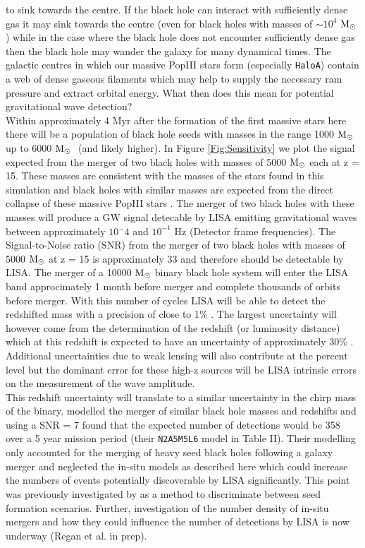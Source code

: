 \documentclass[graphics, twocolumn, usenatbib]{mn2e}
\newcommand{\msolar} {$\rm{M_{\odot}}~$}
\newcommand{\msolarc} {$\rm{M_{\odot}}$}
\newcommand{\hac} {\texttt{HaloA}}
\begin{document}
to sink towards the centre. If the black hole can interact with sufficiently dense gas it may
sink towards the centre (even for black holes with masses of $\sim 10^4$ \msolarc) while in
the case where the black hole does not encounter sufficiently dense gas then the black hole
may wander the galaxy for many dynamical times. The galactic centres in which our massive PopIII
stars form (especially \hac) contain a web of dense gaseous filaments which may help to supply
the necessary ram pressure and extract orbital energy. 
What then does this mean for potential gravitational wave detection?\\
\indent Within approximately 4 Myr after the formation of the first massive stars here there
will be a population of black hole seeds with masses in the range 1000 \msolar up to 6000 \msolar
(and likely higher). In Figure \ref{Fig:Sensitivity} we plot the signal expected from the
merger of two black holes with masses of 5000 \msolar each at z = 15. These masses
are consistent with the masses of the stars found in this simulation and black holes
with similar masses are expected from the direct collapse of these massive PopIII
stars \citep{Heger_2003}. The merger of two black holes with these masses will produce a
GW signal detecable by LISA \citep{Sesana_2016, Cornish_2020} emitting
gravitational waves between approximately $10{^-4}$ and $10^{-1}$ Hz (Detector frame frequencies). The
Signal-to-Noise ratio (SNR) from the merger of two black holes with masses of 5000 \msolar at z = 15
is approximately 33 and therefore should be detectable by LISA. The merger of a 10000 \msolar binary
black hole system will enter the LISA band approcimately 1 month before merger and complete
thousands of orbits before merger. With this number of cycles LISA will be able to detect
the redshifted mass with a precision of close to 1\% \citep{Sesana_2013}. The largest uncertainty
will however come from the determination of the redshift (or luminosity distance) which at this
redshift is expected to have an uncertainty of approximately 30\% \citep{Sesana_2013}. Additional
uncertainties due to weak lensing will also contribute at the percent level
\citep{Shapiro_2010, Petiteau_2011}
but the dominant error for these high-z sources will be LISA intrinsic errors on the measurement of
the wave amplitude. \\
\indent This redshift uncertainty will translate to a similar uncertainty in the chirp mass of the binary.
\cite{Klein_2016} modelled the merger of similar black hole masses and redshifts and using a
SNR = 7 found that the expected number of detections would be 358 over a 5 year mission period
(their \texttt{N2A5M5L6} model in Table II). Their modelling only accounted for the merging of
heavy seed black holes following a galaxy merger and
neglected the in-situ models as described here which could increase the numbers of events potentially
discoverable by LISA significantly. This point was previously investigated by
\cite{Hartwig_2018} as a method to discriminate between seed formation scenarios. Further,
investigation of the number density of in-situ mergers and how they could influence the number
of detections by LISA is now underway (Regan et al. in prep).
\end{document}
